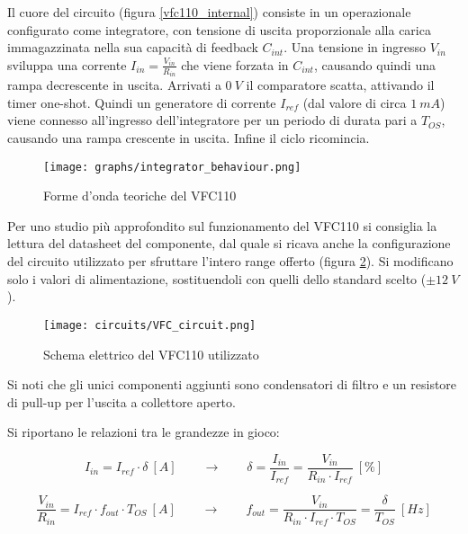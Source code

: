 Il cuore del circuito (figura \ref{vfc110_internal}) consiste in un operazionale configurato
come integratore, con tensione di uscita proporzionale alla carica immagazzinata nella sua
capacità di feedback $C_{int}$. Una tensione in ingresso $V_{in}$ sviluppa una corrente
$I_{in}=\frac{V_{in}}{R_{in}}$ che viene forzata in $C_{int}$, causando quindi una rampa
decrescente in uscita. Arrivati a $0\ V$ il comparatore scatta, attivando il timer one-shot.
Quindi un generatore di corrente $I_{ref}$ (dal valore di circa $1\ mA$) viene connesso
all'ingresso dell'integratore per un periodo di durata pari a $T_{OS}$, causando una rampa
crescente in uscita. Infine il ciclo ricomincia.

\begin{figure}[H]
    \centering
    \texttt{[image: graphs/integrator\_behaviour.png]}
    \caption{Forme d'onda teoriche del VFC110}
    \label{integrator_behaviour}
\end{figure}

Per uno studio più approfondito sul funzionamento del VFC110 si consiglia la lettura del
datasheet del componente, dal quale si ricava anche la configurazione del circuito utilizzato
per sfruttare l'intero range offerto (figura \ref{VFC_circuit}). Si modificano solo i valori
di alimentazione, sostituendoli con quelli dello standard scelto ($\pm 12\ V$).

\begin{figure}[H]
    \centering
    \texttt{[image: circuits/VFC\_circuit.png]}
    \caption{Schema elettrico del VFC110 utilizzato}
    \label{VFC_circuit}
\end{figure}

Si noti che gli unici componenti aggiunti sono condensatori di filtro e un resistore di
pull-up per l'uscita a collettore aperto.

Si riportano le relazioni tra le grandezze in gioco:

\begin{displaymath}
    I_{in}=I_{ref}\cdot\delta\ [A]
    \qquad
    \rightarrow
    \qquad
    \delta=\frac{I_{in}}{I_{ref}}=\frac{V_{in}}{R_{in}\cdot I_{ref}}\ [\%]
\end{displaymath}

\begin{displaymath}
    \frac{V_{in}}{R_{in}}=I_{ref}\cdot f_{out}\cdot T_{OS}\ [A]
    \qquad
    \rightarrow
    \qquad
    f_{out}=\frac{V_{in}}{R_{in}\cdot I_{ref}\cdot T_{OS}}=\frac{\delta}{T_{OS}}\ [Hz]
\end{displaymath}

